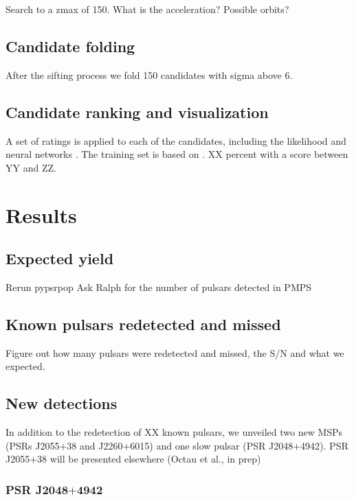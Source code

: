 \documentclass[a4paper,fleqn,usenatbib]{mnras}
\begin{document}
Search to a zmax of 150. What is the acceleration? Possible orbits?

\subsection{Candidate folding}

After the sifting process we fold 150 candidates with sigma above 6.

\subsection{Candidate ranking and visualization}

A set of ratings is applied to each of the candidates, including the
likelihood \citep{lsj+13} and neural networks \citep{zbm+14}.
The training set is based on .
XX percent with a score between YY and ZZ.


\section{Results}
\label{sec:results}


\subsection{Expected yield}

Rerun pypsrpop
Ask Ralph for the number of pulsars detected in PMPS


\subsection{Known pulsars redetected and missed}

Figure out how many pulsars were redetected and missed, the S/N and what we expected.




\subsection{New detections}
In addition to the redetection of XX known pulsars, we unveiled two new MSPs (PSRs J2055$+$38 and J2260$+$6015) and one slow pulsar (PSR J2048$+$4942). PSR J2055$+$38 will be presented elsewhere (Octau et al., in prep) 



\subsubsection{PSR J2048$+$4942}
\end{document}

